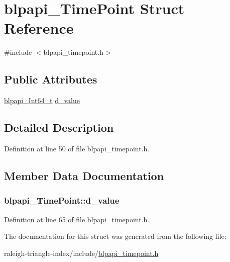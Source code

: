 \hypertarget{structblpapi___time_point}{}\section{blpapi\+\_\+\+Time\+Point Struct Reference}
\label{structblpapi___time_point}


{\ttfamily \#include $<$blpapi\+\_\+timepoint.\+h$>$}

\subsection*{Public Attributes}
\begin{DoxyCompactItemize}
\item 
\hyperlink{blpapi__types_8h_a90013f2ddf364572e1618e388e3fa3c4}{blpapi\+\_\+\+Int64\+\_\+t} \hyperlink{structblpapi___time_point_aa049189608363d55d8117639727906f2}{d\+\_\+value}
\end{DoxyCompactItemize}


\subsection{Detailed Description}


Definition at line 50 of file blpapi\+\_\+timepoint.\+h.



\subsection{Member Data Documentation}
\subsubsection[{\texorpdfstring{d\+\_\+value}{d_value}}]{ blpapi\+\_\+\+Time\+Point\+::d\+\_\+value}\hypertarget{structblpapi___time_point_aa049189608363d55d8117639727906f2}{}\label{structblpapi___time_point_aa049189608363d55d8117639727906f2}


Definition at line 65 of file blpapi\+\_\+timepoint.\+h.



The documentation for this struct was generated from the following file\+:\begin{DoxyCompactItemize}
\item 
raleigh-\/triangle-\/index/include/\hyperlink{blpapi__timepoint_8h}{blpapi\+\_\+timepoint.\+h}\end{DoxyCompactItemize}
